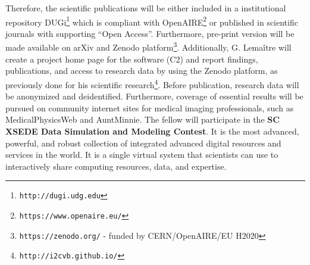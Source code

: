 Therefore, the scientific publications will be either included in a institutional repository DUGi\footnote{\texttt{http://dugi.udg.edu}} which is compliant with OpenAIRE\footnote{\texttt{https://www.openaire.eu/}} or published in scientific journals with supporting ``Open Access''.
Furthermore, pre-print version will be made available on arXiv and Zenodo platform\footnote{\texttt{https://zenodo.org/} - funded by CERN/OpenAIRE/EU H2020}.
Additionally, G. Lema\^itre  will create a project home page for the software (C2) and report findings, publications, and access to research data by using the Zenodo platform, as previously done for his scientific research\footnote{\texttt{http://i2cvb.github.io/}}.
Before publication, research data will be anonymized and deidentified.
Furthermore, coverage of essential results will be pursued on community internet sites for medical imaging professionals, such as MedicalPhysicsWeb and AuntMinnie.
The fellow will participate in the \textbf{SC XSEDE Data Simulation and Modeling Contest}.
It is the most advanced, powerful, and robust collection of integrated advanced digital resources and services in the world.
It is a single virtual system that scientists can use to interactively share computing resources, data, and expertise.


